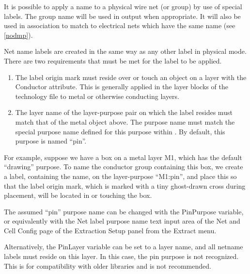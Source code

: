 It is possible to apply a name to a physical wire net (or group) by
use of special labels.  The group name will be used in output when
appropriate.  It will also be used in association to match to
electrical nets which have the same name (see \ref{nodmp}).

Net name labels are created in the same way as any other label in
physical mode.  There are two requirements that must be met for the
label to be applied.

\begin{enumerate}
\item{The label origin mark must reside over or touch an object on a
layer with the {\vt Conductor} attribute.  This is generally applied
in the layer blocks of the technology file to metal or otherwise
conducting layers.}

\item{The layer name of the layer-purpose pair on which the label
resides must match that of the metal object above.  The purpose name
must match the special purpose name defined for this purpose within
{\Xic}.  By default, this purpose is named ``{\vt pin}''.}
\end{enumerate}

For example, suppose we have a box on a metal layer {\vt M1}, which
has the default ``{\vt drawing}'' purpose.  To name the conductor
group containing this box, we create a label, containing the name, on
the layer-purpose ``{\vt M1:pin}'', and place this so that the label
origin mark, which is marked with a tiny ghost-drawn cross during
placement, will be located in or touching the box.

The assumed ``{\vt pin}'' purpose name can be changed with the {\et
PinPurpose} variable, or equivalently with the {\cb Net label purpose
name} text input area of the {\cb Net and Cell Config} page of the
{\cb Extraction Setup} panel from the {\cb Extract menu}.

Alternatively, the {\et PinLayer} variable can be set to a layer name,
and all netname labels must reside on this layer.  In this case, the
pin purpose is not recognized.  This is for compatibility with older
libraries and is not recommended.

